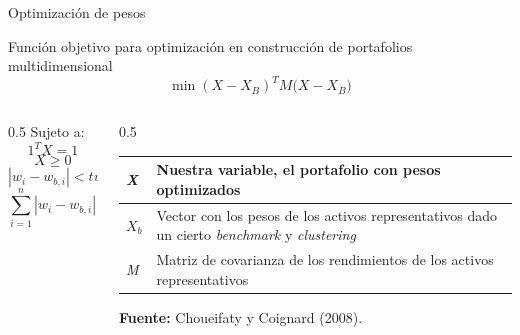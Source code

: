\documentclass[aspectratio=169,xcolor=dvipsnames]{beamer}
\begin{document}
\begin{frame}{Optimización de pesos}
    \begin{block}{Función objetivo para optimización en construcción de portafolios multidimensional}
        \begin{equation}
        \min{\left( X - X_{B} \right)^{T}M(X - X_{B}}) \tag{7}  
        \end{equation}
    \end{block}
    \begin{columns}
        \begin{column}{0.5\textwidth}
            \small
            Sujeto a:
            \begin{equation}
            1^{T}X = 1 \tag{7.2}    
            \end{equation}
            \begin{equation}
            X \geq 0 \tag{7.3}    
            \end{equation}
            \begin{equation}
            \left| w_{i} - w_{b,i} \right| < turnover \tag{7.4}
            \end{equation}
            \begin{equation}
            \sum_{i = 1}^{n}{\left| w_{i} - w_{b,i} \right| \leq t}   \tag{7.5}
            \end{equation}
        \end{column}
        \begin{column}{0.5\textwidth}
            \small
            \begin{tabularx}{\textwidth}{@{}
                >{\raggedright\arraybackslash}p{}
                >{\raggedright\arraybackslash}X@{}}
                \toprule
                \emph{X} & Nuestra variable, el portafolio con pesos optimizados \\
                \midrule
                $X_b$ & Vector con los pesos de los activos representativos dado un cierto \textit{benchmark} y \textit{clustering} \\
                \midrule
                \emph{M} & Matriz de covarianza de los rendimientos de los activos representativos\\
                \bottomrule
            \end{tabularx}

            \vspace{0.5em}
            \small
            \textbf{Fuente:} Choueifaty y Coignard (2008).
        \end{column}    
    \end{columns}
\end{frame}
\end{document}
